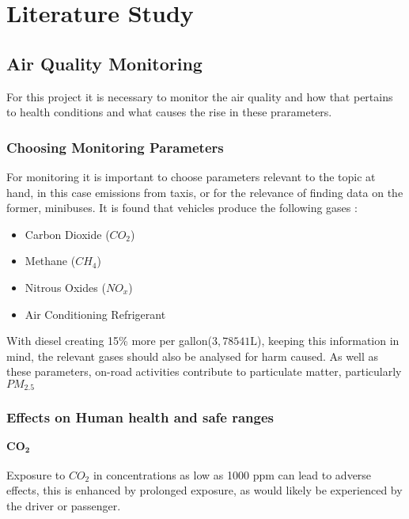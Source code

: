 \chapter{Literature Study}

\section{Air Quality Monitoring}
For this project it is necessary to monitor the air quality and how that pertains to health conditions and what causes the rise in these prarameters.
\subsection{Choosing Monitoring Parameters}
For monitoring it is important to choose parameters relevant to the topic at hand, in this case emissions from taxis, or for the relevance of finding data on the former, minibuses. It is found that vehicles produce the following gases\cite{gasfromvehicles}  :

\begin{itemize}
	\item Carbon Dioxide ($CO_2$)
	\item Methane ($CH_4$)
	\item Nitrous Oxides ($NO_x$)
	\item Air Conditioning Refrigerant
\end{itemize}

\noindent With diesel creating 15\% more per gallon($3,78541\si{\liter}$), keeping this information in mind, the relevant gases should also be analysed for harm caused.
\noindent
As well as these parameters, on-road activities contribute to particulate matter, particularly $PM_{2.5}$ \cite{particulatematter}


\subsection{Effects on Human health and safe ranges}

\subsubsection{$\mathbf{CO_2}$}
Exposure to $CO_2$ in concentrations as low as 1000 ppm can lead to adverse effects\cite{healthrisksco2}, this is enhanced by prolonged exposure, as would likely be experienced by the driver or passenger. 


\pagebreak

